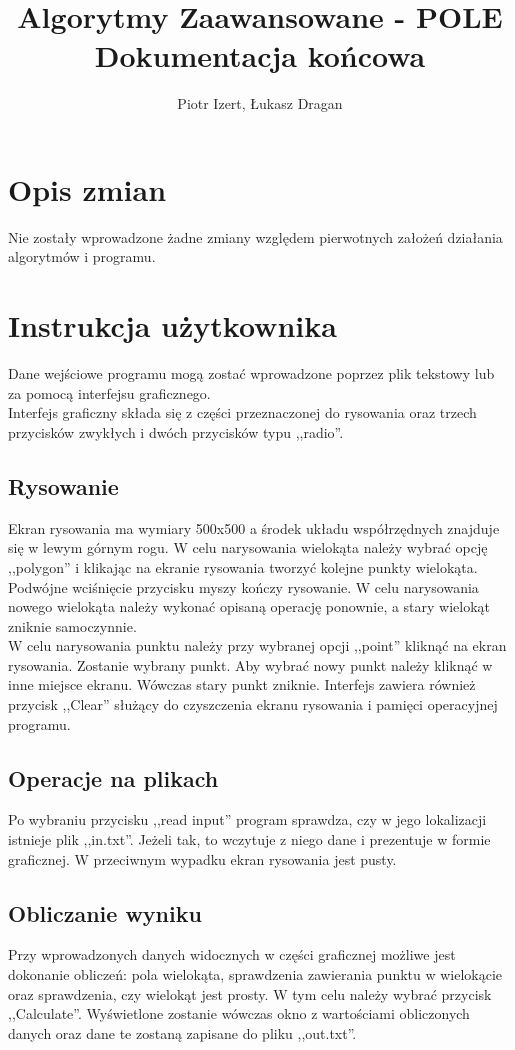 \documentclass{article}
\author{Piotr Izert, Łukasz Dragan}
\title{Algorytmy Zaawansowane - POLE\\Dokumentacja końcowa}
\begin{document}
\maketitle

\newpage
\tableofcontents
\newpage

\section{Opis zmian}
Nie zostały wprowadzone żadne zmiany względem pierwotnych założeń działania algorytmów i programu.
\section{Instrukcja użytkownika}
Dane wejściowe programu mogą zostać wprowadzone poprzez plik tekstowy lub za pomocą interfejsu graficznego.\\
Interfejs graficzny składa się z części przeznaczonej do rysowania oraz trzech przycisków zwykłych i dwóch przycisków typu ,,radio''.
\subsection{Rysowanie}
Ekran rysowania ma wymiary 500x500 a środek układu współrzędnych znajduje się w lewym górnym rogu. W celu narysowania wielokąta należy wybrać opcję ,,polygon'' i klikając na ekranie rysowania tworzyć kolejne punkty wielokąta. Podwójne wciśnięcie przycisku myszy kończy rysowanie. W celu narysowania nowego wielokąta należy wykonać opisaną operację ponownie, a stary wielokąt zniknie samoczynnie.\\
W celu narysowania punktu należy przy wybranej opcji ,,point'' kliknąć na ekran rysowania. Zostanie wybrany punkt. Aby wybrać nowy punkt należy kliknąć w inne miejsce ekranu. Wówczas stary punkt zniknie. Interfejs zawiera również przycisk ,,Clear'' służący do czyszczenia ekranu rysowania i pamięci operacyjnej programu.
\subsection{Operacje na plikach}
Po wybraniu przycisku ,,read input'' program sprawdza, czy w jego lokalizacji istnieje plik ,,in.txt''. Jeżeli tak, to wczytuje z niego dane i prezentuje w formie graficznej. W przeciwnym wypadku ekran rysowania jest pusty.
\subsection{Obliczanie wyniku}
Przy wprowadzonych danych widocznych w części graficznej możliwe jest dokonanie obliczeń: pola wielokąta, sprawdzenia zawierania punktu w wielokącie oraz sprawdzenia, czy wielokąt jest prosty. W tym celu należy wybrać przycisk ,,Calculate''. Wyświetlone zostanie wówczas okno z wartościami obliczonych danych oraz dane te zostaną zapisane do pliku ,,out.txt''.
\end{document}
